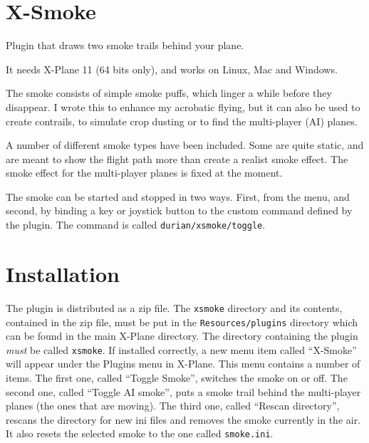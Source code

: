\documentclass[a4paper,12pt]{article}
\begin{document}
\section*{\Huge{\textbf{X-Smoke}}}
\vspace{1cm}

Plugin that draws two smoke trails behind your plane.

\vspace{0.5\baselineskip}
It needs X-Plane 11 (64 bits only), and works on Linux, Mac
and Windows.

\vspace{0.5\baselineskip}
The smoke consists of simple smoke puffs, which linger a
while before they disappear. I wrote this to enhance my acrobatic
flying, but it can also be used to create contrails, to
simulate crop dusting or to find the multi-player (AI) planes.

A number of different smoke types have been included. Some are quite
static, and are meant to show the flight path more than create a
realist smoke effect. The smoke effect for the multi-player planes is
fixed at the moment.

\vspace{0.5\baselineskip}
The smoke can be started and stopped in two ways. First, from the
menu, and second, by binding a key or joystick button to the custom command
defined by the plugin. The command is called
\texttt{durian/xsmoke/toggle}. 

\vspace{1cm}
\section*{\Huge{\textbf{Installation}}}
\vspace{1cm}

The plugin is distributed as a zip file. The \texttt{xsmoke} directory
and its contents, contained in the zip file, must be put in the
\texttt{Resources/plugins} directory which can be found in the main
X-Plane directory. The directory containing the plugin \textsl{must}
be called \texttt{xsmoke}. If installed correctly, a new menu item
called ``X-Smoke'' will appear under the Plugins menu in X-Plane. This
menu contains a number of items. The first one, called ``Toggle
Smoke'', switches the smoke on or off. The second one, called ``Toggle
AI smoke'', puts a smoke trail behind the multi-player planes (the
ones that are moving). The third one, called ``Rescan directory'',
rescans the directory for new ini files and removes the smoke
currently in the air. It also resets the selected smoke to the one
called \texttt{smoke.ini}.
\end{document}

